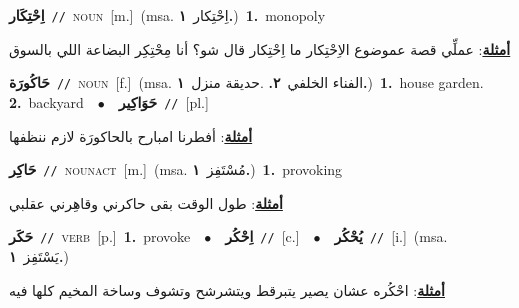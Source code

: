 \documentclass[10pt,a4paper,twoside]{article} %
\begin{document}
\begin{multicols}{2}
{\setlength\topsep{0pt}\textbf{\foreignlanguage{arabic}{اِحْتِكَار}}\ {\color{gray}\texttt{//}\color{black}}\ \textsc{noun}\ [m.]\ \color{gray}(msa. \foreignlanguage{arabic}{اِحْتِكار}~\foreignlanguage{arabic}{\textbf{١.}})\color{black}\ \textbf{1.}~monopoly\  \begin{flushright}\color{gray}\foreignlanguage{arabic}{\textbf{\underline{\foreignlanguage{arabic}{أمثلة}}}: عملِّي قصة عموضوع الاِحْتِكار ما اِحْتِكار قال شو؟ أنا مِحْتِكِر البضاعة اللي بالسوق}\end{flushright}\color{black}} \vspace{2mm}

{\setlength\topsep{0pt}\textbf{\foreignlanguage{arabic}{حَاكُورَة}}\ {\color{gray}\texttt{//}\color{black}}\ \textsc{noun}\ [f.]\ \color{gray}(msa. \foreignlanguage{arabic}{الفناء الخلفي}~\foreignlanguage{arabic}{\textbf{٢.}}  .\foreignlanguage{arabic}{حديقة منزل}~\foreignlanguage{arabic}{\textbf{١.}})\color{black}\ \textbf{1.}~house garden.  \textbf{2.}~backyard\ \ $\bullet$\ \ \setlength\topsep{0pt}\textbf{\foreignlanguage{arabic}{حَوَاكِير}}\ {\color{gray}\texttt{//}\color{black}}\ [pl.]\  \begin{flushright}\color{gray}\foreignlanguage{arabic}{\textbf{\underline{\foreignlanguage{arabic}{أمثلة}}}: أفطرنا امبارح بالحاكورَة لازم ننظفها}\end{flushright}\color{black}} \vspace{2mm}

{\setlength\topsep{0pt}\textbf{\foreignlanguage{arabic}{حَاكِر}}\ {\color{gray}\texttt{//}\color{black}}\ \textsc{noun\textunderscore act}\ [m.]\ \color{gray}(msa. \foreignlanguage{arabic}{مُسْتَفِز}~\foreignlanguage{arabic}{\textbf{١.}})\color{black}\ \textbf{1.}~provoking\  \begin{flushright}\color{gray}\foreignlanguage{arabic}{\textbf{\underline{\foreignlanguage{arabic}{أمثلة}}}: طول الوقت بقى حاكرني وقاهِرني عقلبي}\end{flushright}\color{black}} \vspace{2mm}

{\setlength\topsep{0pt}\textbf{\foreignlanguage{arabic}{حَكَر}}\ {\color{gray}\texttt{//}\color{black}}\ \textsc{verb}\ [p.]\ \textbf{1.}~provoke\ \ $\bullet$\ \ \setlength\topsep{0pt}\textbf{\foreignlanguage{arabic}{اِحْكُر}}\ {\color{gray}\texttt{//}\color{black}}\ [c.]\ \ $\bullet$\ \ \setlength\topsep{0pt}\textbf{\foreignlanguage{arabic}{يُحْكُر}}\ {\color{gray}\texttt{//}\color{black}}\ [i.]\ \color{gray}(msa. \foreignlanguage{arabic}{يَسْتَفِز}~\foreignlanguage{arabic}{\textbf{١.}})\color{black}\  \begin{flushright}\color{gray}\foreignlanguage{arabic}{\textbf{\underline{\foreignlanguage{arabic}{أمثلة}}}: احْكُره عشان يصير يتبرقط ويتشرشح وتشوف وساخة المخيم كلها فيه}\end{flushright}\color{black}} \vspace{2mm}


\end{multicols}
\end{document}
